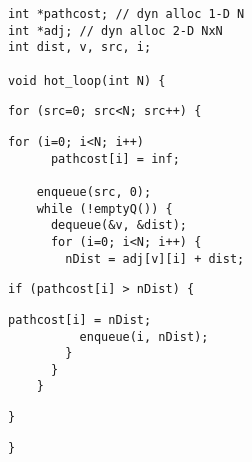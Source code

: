 \begin{lstlisting}[morekeywords={pathcost}, aboveskip=0pt, belowskip=0pt, firstnumber=1]
int *pathcost; // dyn alloc 1-D N
int *adj; // dyn alloc 2-D NxN
int dist, v, src, i;

void hot_loop(int N) {
\end{lstlisting}
\begin{lstlisting}[morekeywords={pathcost}, aboveskip=0pt, belowskip=0pt, firstnumber=9]
  for (src=0; src<N; src++) {
\end{lstlisting}
\begin{lstlisting}[morekeywords={pathcost}, aboveskip=0pt, belowskip=0pt, firstnumber=12]
    for (i=0; i<N; i++)
      pathcost[i] = inf;

    enqueue(src, 0);
    while (!emptyQ()) {
      dequeue(&v, &dist);
      for (i=0; i<N; i++) {
        nDist = adj[v][i] + dist;
\end{lstlisting}
\begin{lstlisting}[morekeywords={pathcost}, aboveskip=0pt, belowskip=0pt, firstnumber=22]
        if (pathcost[i] > nDist) {
\end{lstlisting}
\begin{lstlisting}[morekeywords={pathcost}, aboveskip=0pt, belowskip=0pt, firstnumber=25]
          pathcost[i] = nDist;
          enqueue(i, nDist);
        }
      }
    }
\end{lstlisting}
\begin{lstlisting}[morekeywords={pathcost}, aboveskip=0pt,
belowskip=0pt, firstnumber=34]
  }
\end{lstlisting}
\begin{lstlisting}[morekeywords={pathcost}, aboveskip=0pt,
belowskip=0pt, firstnumber=36]
}
\end{lstlisting}
